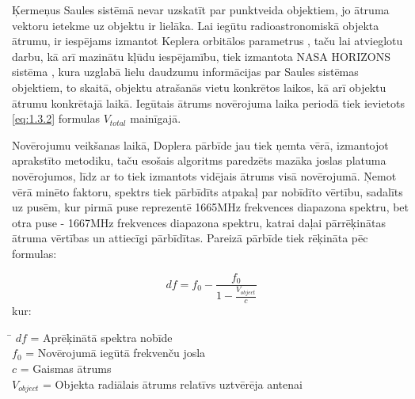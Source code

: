 Ķermeņus Saules sistēmā nevar uzskatīt par punktveida objektiem, jo ātruma vektoru ietekme uz objektu ir lielāka. Lai iegūtu radioastronomiskā objekta ātrumu, ir iespējams izmantot Keplera orbitālos parametrus \cite{kepler-elements}, taču lai atvieglotu darbu, kā arī mazinātu kļūdu iespējamību, tiek izmantota NASA HORIZONS sistēma \cite{horizons}, kura uzglabā lielu daudzumu informācijas par Saules sistēmas objektiem, to skaitā, objektu atrašanās vietu konkrētos laikos, kā arī objektu ātrumu konkrētajā laikā. Iegūtais ātrums novērojuma laika periodā tiek ievietots \eqref{eq:1.3.2} formulas $V_{total}$ mainīgajā.


Novērojumu veikšanas laikā, Doplera pārbīde jau tiek ņemta vērā, izmantojot aprakstīto metodiku, taču esošais algoritms paredzēts mazāka joslas platuma novērojumos, līdz ar to tiek izmantots vidējais ātrums visā novērojumā. Ņemot vērā minēto faktoru, spektrs tiek pārbīdīts atpakaļ par nobīdīto vērtību, sadalīts uz pusēm, kur pirmā puse reprezentē 1665MHz frekvences diapazona spektru, bet otra puse - 1667MHz frekvences diapazona spektru, katrai daļai pārrēķinātas ātruma vērtības un attiecīgi pārbīdītas. Pareizā pārbīde tiek rēķināta pēc formulas:


\begin{equation}
df  = f_0 - \frac{f_0}{1- \frac{V_{object}}{c}}
\tag{1.3.3}\label{eq:1.3.3} 
\end{equation}
kur: 
\begin{tabbing}
\phantom{\hspace{15mm}}\= \kill
${df}$\> = Aprēķinātā spektra nobīde \\
$f_{0}$\>   = Novērojumā iegūtā frekvenču josla\\
$c$\> = Gaismas ātrums\\
$V_{object}$\> = Objekta radiālais ātrums relatīvs uztvērēja antenai \\\\

\end{tabbing}










